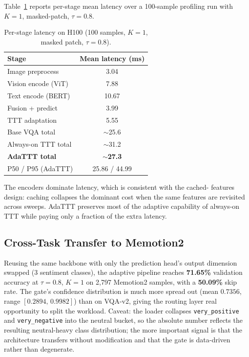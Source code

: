 \documentclass[conference]{IEEEtran}
\begin{document}
Table~\ref{tab:lat} reports per-stage mean latency over a 100-sample
profiling run with $K{=}1$, masked-patch, $\tau{=}0.8$.

\begin{table}[!t]
\caption{Per-stage latency on H100 (100 samples, $K{=}1$, masked patch,
$\tau{=}0.8$).}
\label{tab:lat}
\centering\footnotesize
\begin{tabular}{lc}
\toprule
\textbf{Stage} & \textbf{Mean latency (ms)} \\
\midrule
Image preprocess  & 3.04 \\
Vision encode (ViT)  & 7.88 \\
Text encode (BERT)   & 10.67 \\
Fusion + predict     & 3.99 \\
TTT adaptation       & 5.55 \\
\midrule
Base VQA total       & $\sim$25.6 \\
Always-on TTT total  & $\sim$31.2 \\
\textbf{AdaTTT total}& \textbf{$\sim$27.3} \\
P50 / P95 (AdaTTT)   & 25.86 / 44.99 \\
\bottomrule
\end{tabular}
\end{table}

The encoders dominate latency, which is consistent with the cached-
features design: caching collapses the dominant cost when the same
features are revisited across sweeps. AdaTTT preserves most of the
adaptive capability of always-on TTT while paying only a fraction of
the extra latency.

\subsection{Cross-Task Transfer to Memotion2}

Reusing the same backbone with only the prediction head's output
dimension swapped (3 sentiment classes), the adaptive pipeline reaches
\textbf{71.65\%} validation accuracy at $\tau{=}0.8$, $K{=}1$ on 2{,}797
Memotion2 samples, with a \textbf{50.09\%} skip rate. The gate's
confidence distribution is much more spread out (mean $0.7356$, range
$[0.2894,\,0.9982]$) than on VQA-v2, giving the routing layer real
opportunity to split the workload. Caveat: the loader collapses
\texttt{very\_positive} and \texttt{very\_negative} into the neutral
bucket, so the absolute number reflects the resulting neutral-heavy
class distribution; the more important signal is that the architecture
transfers without modification and that the gate is data-driven rather
than degenerate.
\end{document}
